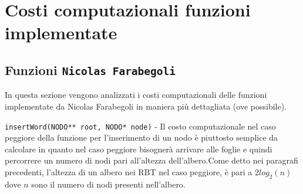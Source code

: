 \documentclass[paper=a4, fontsize=11pt,twoside]{scrartcl}   %
\begin{document}
		\section{Costi computazionali funzioni implementate}
			\subsection{Funzioni \texttt{Nicolas Farabegoli}}
				In questa sezione vengono analizzati i costi computazionali delle funzioni implementate da Nicolas Farabegoli in maniera più dettagliata (ove possibile).
								
				\texttt{insertWord(NODO** root, NODO* node)} - Il costo computazionale nel caso peggiore della funzione per l'inserimento di un nodo è piuttosto semplice da calcolare in quanto nel caso peggiore bisognerà arrivare alle foglie e quindi percorrere un numero di nodi pari all'altezza dell'albero.Come detto nei paragrafi precedenti, l'altezza di un albero nei RBT nel caso peggiore, è pari a $2log_2(n)$ dove $n$ sono il numero di nodi presenti nell'albero.\par
		 
\end{document}
